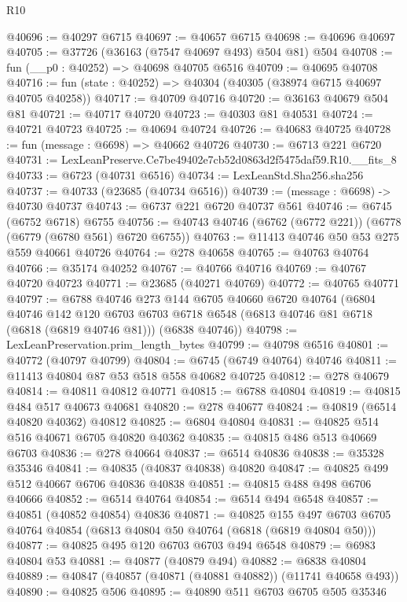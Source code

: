\begin{lexlean}{R10}
\begin{coremodule}
@40696 := @40297 @6715
@40697 := @40657 @6715
@40698 := @40696 @40697
@40705 := @37726 (@36163 (@7547 @40697 @493) @504 @81) @504
@40708 := fun (__p0 : @40252) => @40698 @40705 @6516
@40709 := @40695 @40708
@40716 := fun (state : @40252) => @40304 (@40305 (@38974 @6715 @40697 @40705 @40258))
@40717 := @40709 @40716
@40720 := @36163 @40679 @504 @81
@40721 := @40717 @40720
@40723 := @40303 @81 @40531
@40724 := @40721 @40723
@40725 := @40694 @40724
@40726 := @40683 @40725
@40728 := fun (message : @6698) => @40662 @40726
@40730 := @6713 @221 @6720
@40731 := LexLeanPreserve.Ce7be49402e7cb52d0863d2f5475daf59.R10.__fits_8
@40733 := @6723 (@40731 @6516)
@40734 := LexLeanStd.Sha256.sha256
@40737 := @40733 (@23685 (@40734 @6516))
@40739 := (message : @6698) -> @40730 @40737
@40743 := @6737 @221 @6720 @40737 @561
@40746 := @6745 (@6752 @6718) @6755
@40756 := @40743 @40746 (@6762 (@6772 @221)) (@6778 (@6779 (@6780 @561) @6720 @6755))
@40763 := @11413 @40746 @50 @53 @275 @559 @40661 @40726
@40764 := @278 @40658
@40765 := @40763 @40764
@40766 := @35174 @40252
@40767 := @40766 @40716
@40769 := @40767 @40720 @40723
@40771 := @23685 (@40271 @40769)
@40772 := @40765 @40771
@40797 := @6788
    @40746
    @273
    @144
    @6705
    @40660
    @6720
    @40764
    (@6804
      @40746
      @142
      @120
      @6703
      @6703
      @6718
      @6548
      (@6813 @40746 @81 @6718 (@6818 (@6819 @40746 @81)))
      (@6838 @40746))
@40798 := LexLeanPreservation.prim_length_bytes
@40799 := @40798 @6516
@40801 := @40772 (@40797 @40799)
@40804 := @6745 (@6749 @40764) @40746
@40811 := @11413 @40804 @87 @53 @518 @558 @40682 @40725
@40812 := @278 @40679
@40814 := @40811 @40812 @40771
@40815 := @6788 @40804
@40819 := @40815 @484 @517 @40673 @40681
@40820 := @278 @40677
@40824 := @40819 (@6514 @40820 @40362) @40812
@40825 := @6804 @40804
@40831 := @40825 @514 @516 @40671 @6705 @40820 @40362
@40835 := @40815 @486 @513 @40669 @6703
@40836 := @278 @40664
@40837 := @6514 @40836
@40838 := @35328 @35346
@40841 := @40835 (@40837 @40838) @40820
@40847 := @40825 @499 @512 @40667 @6706 @40836 @40838
@40851 := @40815 @488 @498 @6706 @40666
@40852 := @6514 @40764
@40854 := @6514 @494 @6548
@40857 := @40851 (@40852 @40854) @40836
@40871 := @40825
    @155
    @497
    @6703
    @6705
    @40764
    @40854
    (@6813 @40804 @50 @40764 (@6818 (@6819 @40804 @50)))
@40877 := @40825 @495 @120 @6703 @6703 @494 @6548
@40879 := @6983 @40804 @53
@40881 := @40877 (@40879 @494)
@40882 := @6838 @40804
@40889 := @40847 (@40857 (@40871 (@40881 @40882)) (@11741 @40658 @493))
@40890 := @40825 @506
@40895 := @40890 @511 @6703 @6705 @505 @35346

\end{coremodule}
\end{lexlean}
